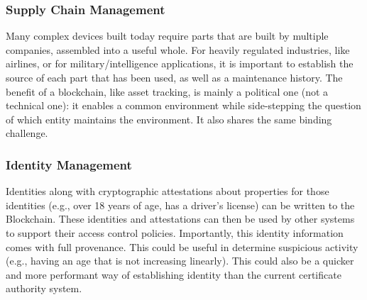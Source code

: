 
\subsubsection{Supply Chain Management} %
Many complex devices built today require parts that are built by multiple companies, assembled into a useful whole. For heavily regulated industries, like airlines, or for military/intelligence applications, it is important to establish the source of each part that has been used, as well as a maintenance history. The benefit of a blockchain, like asset tracking, is mainly a political one (not a technical one): it enables a common environment while side-stepping the question of which entity maintains the environment. It also shares the same binding challenge.


\subsubsection{Identity Management}
Identities along with cryptographic attestations about properties for those identities (e.g., over 18 years of age, has a driver's license) can be written to the Blockchain.
These identities and attestations can then be used by other systems to support their access control policies.
Importantly, this identity information comes with full provenance. This could be useful in determine suspicious activity (e.g., having an age that is not increasing linearly).
This could also be a quicker and more performant way of establishing identity than the current certificate authority system.


